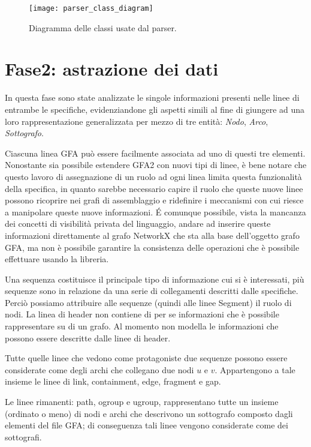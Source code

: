 \captionsetup{justification=centering}
\begin{figure}[h]
	\centering
	\texttt{[image: parser\_class\_diagram]}
	\caption[Diagramma delle classi del package parser]{Diagramma delle classi usate dal parser.}
\end{figure}
\captionsetup{justification=justified}
\clearpage

\section{Fase2: astrazione dei dati}
In questa fase sono state analizzate le singole informazioni presenti
nelle linee di entrambe le specifiche, evidenziandone gli aspetti simili al
fine di giungere ad una loro rappresentazione generalizzata per mezzo di tre
entità: \emph{Nodo}, \emph{Arco}, \emph{Sottografo}.

Ciascuna linea GFA può essere facilmente associata ad uno di questi tre
elementi. Nonostante sia possibile estendere GFA2 con nuovi tipi di linee, è bene notare
che questo lavoro di assegnazione di un ruolo ad ogni linea limita questa funzionalità
della specifica, in quanto sarebbe necessario capire il ruolo che queste nuove
linee possono ricoprire nei grafi di assemblaggio e ridefinire i meccanismi con
cui \pygfa riesce a manipolare queste nuove informazioni. \'E comunque possibile,
vista la mancanza dei concetti di visibilità privata del linguaggio, andare ad inserire
queste informazioni direttamente al grafo NetworkX che sta alla base dell'oggetto grafo
GFA, ma non è possibile garantire la consistenza delle operazioni che è possibile
effettuare usando la libreria.

Una sequenza costituisce il principale tipo di informazione cui si
è interessati, più sequenze sono in relazione da una serie di collegamenti descritti
dalle specifiche. Perciò possiamo attribuire alle sequenze (quindi alle linee Segment)
il ruolo di nodi.
La linea di header non contiene di per se informazioni che è possibile rappresentare
su di un grafo. Al momento \pygfa non modella le informazioni che possono essere
descritte dalle linee di header.

Tutte quelle linee che vedono come protagoniste due sequenze possono essere
considerate come degli archi che collegano due nodi $u$ e $v$. Appartengono
a tale insieme le linee di link, containment, edge, fragment e gap.

Le linee rimanenti: path, ogroup e ugroup, rappresentano tutte un insieme
(ordinato o meno) di nodi e archi che descrivono un sottografo composto
dagli elementi del file GFA; di conseguenza tali linee vengono considerate come
dei sottografi.

